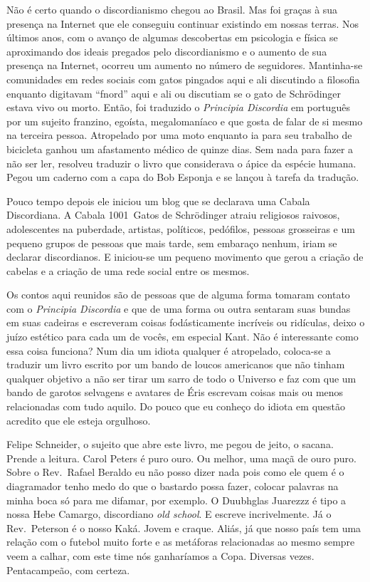 Não é certo quando o discordianismo chegou ao Brasil. Mas foi graças à sua presença na Internet que ele conseguiu continuar existindo em nossas terras. Nos últimos anos, com o avanço de algumas descobertas em psicologia e física se aproximando dos ideais pregados pelo discordianismo e o aumento de sua presença na Internet, ocorreu um aumento no número de seguidores.  Mantinha-se comunidades em redes sociais com gatos pingados aqui e ali discutindo a filosofia enquanto digitavam ``fnord'' aqui e ali ou discutiam se o gato de Schrödinger estava vivo ou morto. Então, foi traduzido o \emph{Principia Discordia} em português por um sujeito franzino, egoísta, megalomaníaco e que gosta de falar de si mesmo na terceira pessoa. Atropelado por uma moto enquanto ia para seu trabalho de bicicleta ganhou um afastamento médico de quinze dias. Sem nada para fazer a não ser ler, resolveu traduzir o livro que considerava o ápice da espécie humana. Pegou um caderno com a capa do Bob Esponja e se lançou à tarefa da tradução.

\begin{sloppypar}
Pouco tempo depois ele iniciou um blog que se declarava uma Cabala Discordiana. A Cabala 1001~Gatos de Schrödinger atraiu religiosos raivosos, adolescentes na puberdade, artistas, políticos, pedófilos, pessoas grosseiras e um pequeno grupos de pessoas que mais tarde, sem embaraço nenhum, iriam se declarar discordianos. E iniciou-se um pequeno movimento que gerou a criação de cabelas e a criação de uma rede social entre os mesmos.
\end{sloppypar}

Os contos aqui reunidos são de pessoas que de alguma forma tomaram contato com o \emph{Principia Discordia} e que de uma forma ou outra sentaram suas bundas em suas cadeiras e escreveram coisas fodásticamente incríveis ou ridículas, deixo o juízo estético para cada um de vocês, em especial Kant. Não é interessante como essa coisa funciona? Num dia um idiota qualquer é atropelado, coloca-se a traduzir um livro escrito por um bando de loucos americanos que não tinham qualquer objetivo a não ser tirar um sarro de todo o Universo e faz com que um bando de garotos selvagens e avatares de Éris escrevam coisas mais ou menos relacionadas com tudo aquilo. Do pouco que eu conheço do idiota em questão acredito que ele esteja orgulhoso.

Felipe Schneider, o sujeito que abre este livro, me pegou de jeito, o sacana. Prende a leitura. Carol Peters é puro ouro. Ou melhor, uma maçã de ouro puro. Sobre o Rev.~Rafael Beraldo eu não posso dizer nada pois como ele quem é o diagramador tenho medo do que o bastardo possa fazer, colocar palavras na minha boca só para me difamar, por exemplo. O Duubhglas Juarezzz é tipo a nossa Hebe Camargo, discordiano \foreignlanguage{english}{\emph{old school}}. E escreve incrivelmente. Já o Rev.~Peterson é o nosso Kaká. Jovem e craque. Aliás, já que nosso país tem uma relação com o futebol muito forte e as metáforas relacionadas ao mesmo sempre veem a calhar, com este time nós ganharíamos a Copa. Diversas vezes. Pentacampeão, com certeza.

